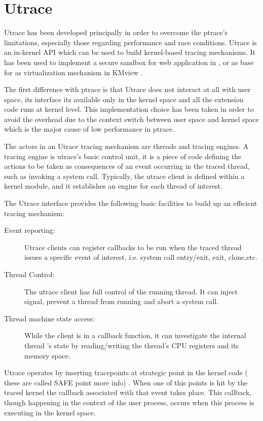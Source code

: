 \section{Utrace}
Utrace has been developed principally in order to overcome the ptrace’s limitations, especially those regarding performance and race conditions. Utrace is an in-kernel API which can be used to build kernel-based tracing mechanisms. It has been used to implement a secure sandbox for web application in \cite{OcvtavianPurdila:2006:Utrace}, or as base for as virtualization mechanism in KMview \cite{RenzoDavoli:2007:Online}.  

The first difference with ptrace is that Utrace does not interact at all with user space, its interface its available only in the kernel space and all the extension code runs at kernel level. This implementation choice has been taken in order to avoid the overhead due to the context switch between user space and kernel space which is the major cause of low performance in ptrace.
 
The actors in an Utrace tracing mechanism are threads and tracing engines. A tracing engine is utrace's basic control unit, it is a piece of code defining the actions to be taken as consequences of an event occurring in the traced thread, such as invoking a system call. Typically, the utrace client is defined within a kernel module, and it establishes an engine for each thread of interest.

The Utrace interface provides the following basic facilities to build up an efficient tracing mechanism: 
\begin{description}
\item[Event reporting:]
		Utrace clients can register callbacks to be run when the traced thread issues a specific event of interest, i.e. system call entry/exit, exit, clone,etc.
\item[Thread Control:]
		The utrace client has full control of the running thread. It can inject signal, prevent a thread from running and abort a system call.   
\item[Thread machine state access:]
		While the client is  in a callback function, it can investigate the internal thread 's state by reading/writing the thread’s CPU registers and its memory space.	
\end{description}

Utrace operates by inserting tracepoints at strategic point in the kernel code ( these are called SAFE point more info) .  When one of this points is hit by the traced kernel the callback associated with that event takes place. This callback, though happening in the context of the user process,  occurs when this process is executing in the kernel space.  

